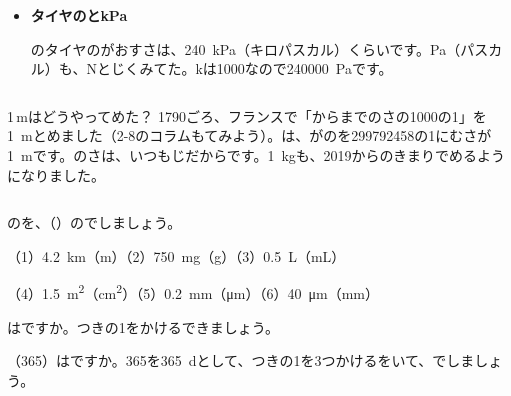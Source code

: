 \begin{butsuri}
\begin{itemize}[leftmargin=1.2\zw, itemsep=1pt, topsep=4pt, label={\color{bkPurple}●}]
\item \textbf{タイヤのとkPa}\par\noindent {}のタイヤのがおすさは、\qty{240}{kPa}（キロパスカル）くらいです。Pa（パスカル）も、Nとじくみてた。kは1000なので\mbox{\qty{240000}{Pa}}です。
\end{itemize}
\end{butsuri}

\begin{column}{1\,mはどうやってめた？}
1790ごろ、フランスで「からまでのさの1000の1」を\qty{1}{m}とめました（2-8のコラムもてみよう）。は、がのを299792458の1にむさが\qty{1}{m}です。のさは、いつもじだからです。\qty{1}{kg}も、2019からのきまりでめるようになりました。
\end{column}

\clearpage
\bkendproblems
{}

\bkproblem {}のを、（\quad）のでしましょう。\par
（1）\nobreak \qty{4.2}{km}（m）\quad（2）\nobreak \qty{750}{mg}（g）\quad（3）\nobreak \qty{0.5}{L}（mL）\par
（4）\nobreak \qty{1.5}{m^2}（\unit{cm^2}）\quad（5）\nobreak \qty{0.2}{mm}（\unit{\micro m}）\quad（6）\nobreak \qty{40}{\micro m}（mm）

はですか。つきの1をかけるできましょう。

（365）はですか。365を\qty{365}{d}として、つきの1を3つかけるをいて、でしましょう。


